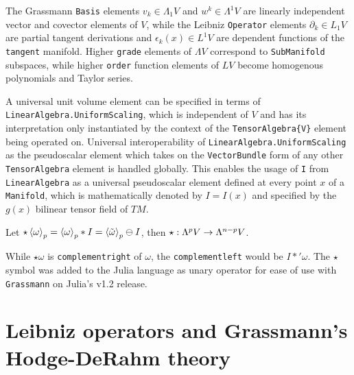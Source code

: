 \documentclass{juliacon}
\begin{document}
The Grassmann \verb`Basis` elements $v_k\in\Lambda_1V$ and $w^k\in\Lambda^1V$ are linearly independent vector and covector elements of $V$, while the Leibniz \verb`Operator` elements $\partial_k\in L_1V$ are partial tangent derivations and $\epsilon_k(x)\in L^1V$ are dependent functions of the \verb`tangent` manifold. 
Higher \verb`grade` elements of $\Lambda V$ correspond to \verb`SubManifold` subspaces, while higher \verb`order` function elements of $LV$ become homogenous polynomials and Taylor series.


A universal unit volume element can be specified in terms of \verb`LinearAlgebra.UniformScaling`, which is independent of $V$ and has its interpretation only instantiated by the context of the \verb`TensorAlgebra{V}` element being operated on.
Universal interoperability of \verb`LinearAlgebra.UniformScaling` as the pseudoscalar element which takes on the \verb`VectorBundle` form of any other \verb`TensorAlgebra` element is handled globally.
This enables the usage of \verb`I` from \verb`LinearAlgebra` as a universal pseudoscalar element defined at every point $x$ of a \verb`Manifold`, which is mathematically denoted by $I=I(x)$ and specified by the $g(x)$ bilinear tensor field of $TM$.

\begin{definition}
	Let $\star\left\langle \omega \right\rangle_p = \left\langle \omega \right\rangle_p\ast I = \left\langle \tilde\omega \right\rangle_p\ominus I$, %
	 then $\star : \Lambda^pV\rightarrow\Lambda^{n-p}V$.
\end{definition}
\begin{remark}
	While $\star\omega$ is \verb`complementright` of $\omega$, the \verb`complementleft` would be $I\ast'\omega$. The $\star$ symbol was added to the Julia language as unary operator for ease of use with \verb`Grassmann` on Julia's v1.2 release.
\end{remark}

\section{Leibniz operators and Grassmann's Hodge-DeRahm theory}
\end{document}
